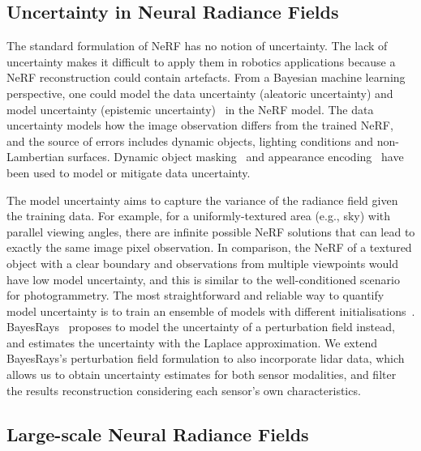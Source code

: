 \subsection{Uncertainty in Neural Radiance Fields}
The standard formulation of NeRF has no notion of uncertainty. The lack of uncertainty makes it difficult to apply them in robotics applications because a NeRF reconstruction could contain artefacts. From a Bayesian machine learning perspective, one could model the data uncertainty (aleatoric uncertainty) and model uncertainty (epistemic uncertainty)~\cite{kendall2017uncertainties} in the NeRF model. The data uncertainty models how the image observation differs from the trained NeRF, and the source of errors includes dynamic objects, lighting conditions and non-Lambertian surfaces. Dynamic object masking~\cite{Sabour2023robustnerf} and appearance encoding~\cite{martinbrualla2020nerfw} have been used to model or mitigate data uncertainty.

The model uncertainty aims to capture the variance of the radiance field given the training data. For example, for a uniformly-textured area (e.g., sky) with parallel viewing angles, there are infinite possible NeRF solutions that can lead to exactly the same image pixel observation. In comparison, the NeRF of a textured object with a clear boundary and observations from multiple viewpoints would have low model uncertainty, and this is similar to the well-conditioned scenario for photogrammetry. The most straightforward and reliable way to quantify model uncertainty is to train an ensemble of models with different initialisations~\cite{lakshminarayanan2017simple}. BayesRays~\cite{goli2023bayesrays} proposes to model the uncertainty of a perturbation field instead, and estimates the uncertainty with the Laplace approximation. We extend BayesRays's perturbation field formulation to also incorporate lidar data, which allows us to obtain uncertainty estimates for both sensor modalities, and filter the results reconstruction considering each sensor's own characteristics.


\subsection{Large-scale Neural Radiance Fields}

